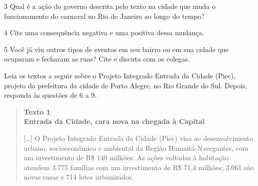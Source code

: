 \num{3} Qual é a ação do governo descrita pelo texto na cidade que muda o
funcionamento do carnaval no Rio de Janeiro ao longo do tempo?


\num{4} Cite uma consequência negativa e uma positiva dessa mudança.



\num{5} Você já viu outros tipos de eventos em seu bairro ou em sua cidade que
ocuparam e fecharam as ruas? Cite e discuta com os colegas.


\pagebreak
\noindent{}Leia os textos a seguir sobre o Projeto Integrado Entrada da Cidade
(Piec), projeto da prefeitura da cidade de Porto Alegre, no Rio Grande
do Sul. Depois, responda às questões de 6 a 9.

\begin{quote}
\textbf{Texto 1}\\
\textbf{Entrada da Cidade, cara nova na chegada à Capital}

{[}\ldots{}{]} O Projeto Integrado Entrada da Cidade (Piec) visa ao desenvolvimento
urbano, socioeconômico e ambiental da Região Humaitá-Navegantes, com um
investimento de R\$ 140 milhões. As ações voltadas à habitação atendem
3.775 famílias com um investimento de R\$ 71,4 milhões; 3.061 são novas
casas e 714 lotes urbanizados.

\end{quote}

